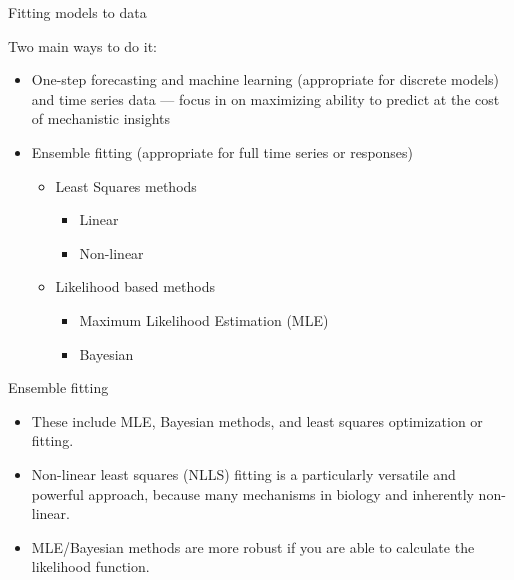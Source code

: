 \documentclass[xcolor=x11names,compress]{beamer}
\renewcommand{\(}{\begin{columns}}
\renewcommand{\)}{\end{columns}}
\newcommand{\<}[1]{\begin{column}{#1}}
\renewcommand{\>}{\end{column}}
\begin{document}
\begin{frame}{Fitting models to data}

Two main ways to do it:

\begin{itemize}\itemsep10pt

	\item One-step forecasting and machine learning (appropriate for discrete models) and time 
	series data --- focus in on maximizing ability to predict at the cost of mechanistic insights 

	\item Ensemble fitting (appropriate for full time series or responses)
	\begin{itemize}
	\item Least Squares methods
	\begin{itemize}
	 \item Linear 
	 \item Non-linear
	\end{itemize}
	\item Likelihood based methods 
	\begin{itemize}
	 \item Maximum Likelihood Estimation (MLE) 
	 \item Bayesian
	\end{itemize}

	\end{itemize}
	
\end{itemize}

\end{frame}

\begin{frame}{Ensemble fitting}

\begin{itemize}
	
\item These include MLE, Bayesian methods, and least squares optimization or fitting. 

\item Non-linear least squares (NLLS) fitting is a particularly versatile and powerful approach, because many mechanisms in biology and inherently non-linear.  

\item MLE/Bayesian methods are more robust if you are able to calculate the likelihood function.

\end{itemize}

\end{frame}
\end{document}
